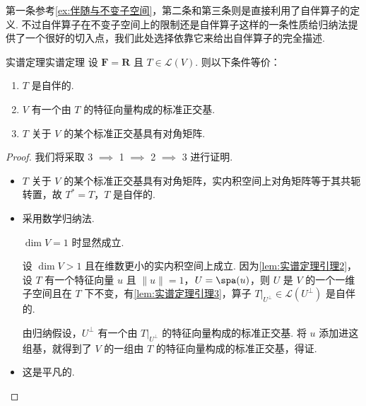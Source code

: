 第一条参考\autoref{ex:伴随与不变子空间}，第二条和第三条则是直接利用了自伴算子的定义. 不过自伴算子在不变子空间上的限制还是自伴算子这样的一条性质给归纳法提供了一个很好的切入点，我们此处选择依靠它来给出自伴算子的完全描述.

\begin{theorem}{实谱定理}{实谱定理} 
    设 $ \mathbf{F} = \mathbf{R} $ 且 $ T \in \mathcal{L}(V) $. 则以下条件等价：
    \begin{enumerate}
        \item \label{item:24:实谱定理:1}
              $ T $ 是自伴的.

        \item \label{item:24:实谱定理:2}
              $ V $ 有一个由 $ T $ 的特征向量构成的标准正交基.

        \item \label{item:24:实谱定理:3}
              $ T $ 关于 $ V $ 的某个标准正交基具有对角矩阵.
    \end{enumerate}
\end{theorem}

\begin{proof}
    我们将采取 3 $\implies$ 1 $\implies$ 2 $\implies$ 3 进行证明.

    \begin{itemize}
        \item[\ref*{item:24:实谱定理:3}$\implies$\ref*{item:24:实谱定理:1}] $ T $ 关于 $ V $ 的某个标准正交基具有对角矩阵，实内积空间上对角矩阵等于其共轭转置，故 $ T^* = T $，$ T $ 是自伴的.

        \item[\ref*{item:24:实谱定理:1}$\implies$\ref*{item:24:实谱定理:2}] 采用数学归纳法.

              $ \dim V = 1 $ 时显然成立.

              设 $ \dim V > 1 $ 且在维数更小的实内积空间上成立. 因为\autoref{lem:实谱定理引理2}，设 $ T $ 有一个特征向量 $ u $ 且 $ \lVert u \rVert = 1 $，$ U = \spa(u) $，则 $ U $ 是 $ V $ 的一个一维子空间且在 $ T $ 下不变，有\autoref{lem:实谱定理引理3}，算子 $ T|_{U^{\perp }} \in \mathcal{L}(U^{\perp }) $ 是自伴的.

              由归纳假设，$ U^{\perp } $ 有一个由 $ T|_{U^{\perp }} $ 的特征向量构成的标准正交基. 将 $ u $ 添加进这组基，就得到了 $ V $ 的一组由 $ T $ 的特征向量构成的标准正交基，得证.

        \item[\ref*{item:24:实谱定理:2}$\implies$\ref*{item:24:实谱定理:3}] 这是平凡的.
    \end{itemize}
\end{proof}

